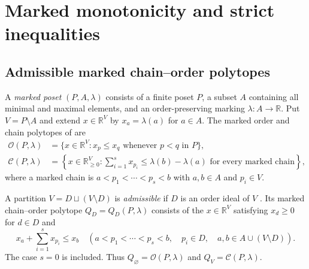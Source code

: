 \documentclass[a4paper,12pt]{amsart}
\theoremstyle{definition}
\theoremstyle{remark}
\newcommand{\OO}{\mathcal O}
\newcommand{\CC}{\mathcal C}
\begin{document}
\section{Marked monotonicity and strict inequalities}\label{sec:extensions}

\subsection{Admissible marked chain--order polytopes}
A \emph{marked poset} $(P,A,\lambda)$ consists of a finite poset $P$, a subset $A$ containing all minimal and maximal elements, and an order-preserving marking $\lambda:A\to\mathbb R$.
Put $V=P\setminus A$ and extend $x\in\mathbb R^V$ by $x_a=\lambda(a)$ for $a\in A$.
The marked order and chain polytopes of \cite{ABS11} are
\begin{align*}
 \OO(P,\lambda)
 &=\{x\in\mathbb R^V:x_p\leq x_q\text{ whenever }p<q\text{ in }P\},\\
 \CC(P,\lambda)
 &=\left\{x\in\mathbb R_{\geq0}^V:
       \sum_{i=1}^s x_{p_i}\leq\lambda(b)-\lambda(a)
       \text{ for every marked chain}\right\},
\end{align*}
where a marked chain is $a<p_1<\cdots<p_s<b$ with $a,b\in A$ and $p_i\in V$.

A partition $V=D\sqcup(V\setminus D)$ is \emph{admissible} if $D$ is an order ideal of $V$ \cite{FF16}.
Its marked chain--order polytope $Q_D=Q_D(P,\lambda)$ consists of the $x\in\mathbb R^V$ satisfying $x_d\geq0$ for $d\in D$ and
\[
 x_a+\sum_{i=1}^s x_{p_i}\leq x_b
 \quad(a<p_1<\cdots<p_s<b,\quad p_i\in D,\quad
 a,b\in A\cup(V\setminus D)).
\]
The case $s=0$ is included.
Thus $Q_\varnothing=\OO(P,\lambda)$ and $Q_V=\CC(P,\lambda)$.
\end{document}
